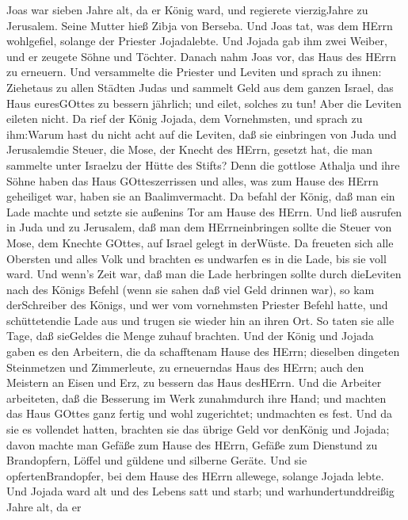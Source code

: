 Joas war sieben Jahre alt, da er König ward, und regierete
vierzigJahre zu Jerusalem. Seine Mutter hieß Zibja von Berseba.
 Und Joas tat, was dem HErrn wohlgefiel, solange der
Priester Jojadalebte.  Und Jojada gab ihm zwei Weiber, und
er zeugete Söhne und Töchter.  Danach nahm Joas vor, das
Haus des HErrn zu erneuern.  Und versammelte die Priester
und Leviten und sprach zu ihnen: Ziehetaus zu allen Städten Judas und
sammelt Geld aus dem ganzen Israel, das Haus euresGOttes zu bessern
jährlich; und eilet, solches zu tun! Aber die Leviten eileten nicht.
 Da rief der König Jojada, dem Vornehmsten, und sprach zu
ihm:Warum hast du nicht acht auf die Leviten, daß sie einbringen von
Juda und Jerusalemdie Steuer, die Mose, der Knecht des HErrn, gesetzt
hat, die man sammelte unter Israelzu der Hütte des Stifts? 
Denn die gottlose Athalja und ihre Söhne haben das Haus GOtteszerrissen
und alles, was zum Hause des HErrn geheiliget war, haben sie an
Baalimvermacht.  Da befahl der König, daß man ein Lade
machte und setzte sie außenins Tor am Hause des HErrn.  Und
ließ ausrufen in Juda und zu Jerusalem, daß man dem HErrneinbringen
sollte die Steuer von Mose, dem Knechte GOttes, auf Israel gelegt in
derWüste.  Da freueten sich alle Obersten und alles Volk
und brachten es undwarfen es in die Lade, bis sie voll ward.
 Und wenn's Zeit war, daß man die Lade herbringen sollte
durch dieLeviten nach des Königs Befehl (wenn sie sahen daß viel Geld
drinnen war), so kam derSchreiber des Königs, und wer vom vornehmsten
Priester Befehl hatte, und schüttetendie Lade aus und trugen sie wieder
hin an ihren Ort. So taten sie alle Tage, daß sieGeldes die Menge zuhauf
brachten.  Und der König und Jojada gaben es den Arbeitern,
die da schafftenam Hause des HErrn; dieselben dingeten Steinmetzen und
Zimmerleute, zu erneuerndas Haus des HErrn; auch den Meistern an Eisen
und Erz, zu bessern das Haus desHErrn.  Und die Arbeiter
arbeiteten, daß die Besserung im Werk zunahmdurch ihre Hand; und machten
das Haus GOttes ganz fertig und wohl zugerichtet; undmachten es fest.
 Und da sie es vollendet hatten, brachten sie das übrige
Geld vor denKönig und Jojada; davon machte man Gefäße zum Hause des
HErrn, Gefäße zum Dienstund zu Brandopfern, Löffel und güldene und
silberne Geräte. Und sie opfertenBrandopfer, bei dem Hause des HErrn
allewege, solange Jojada lebte.  Und Jojada ward alt und
des Lebens satt und starb; und warhundertunddreißig Jahre alt, da er
